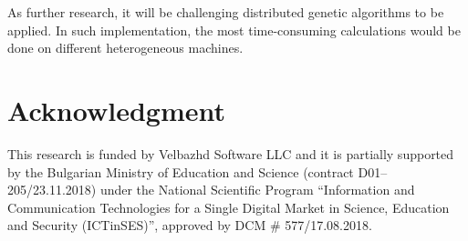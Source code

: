 \documentclass[conference]{IEEEtran}
\begin{document}
As further research, it will be challenging distributed genetic algorithms to be applied. In such implementation, the most time-consuming calculations would be done on different heterogeneous machines. 

\section*{Acknowledgment}

This research is funded by Velbazhd Software LLC and it is partially supported by the Bulgarian Ministry of Education and Science (contract D01–205/23.11.2018) under the National Scientific Program ``Information and Communication Technologies for a Single Digital Market in Science, Education and Security (ICTinSES)'', approved by DCM \# 577/17.08.2018.
\end{document}
